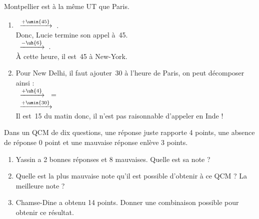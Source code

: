 \begin{colonne*exercice}
\begin{corrige}
   Montpellier est à la même UT que Paris. \\
   \begin{enumerate}
      \item {}\, \quad $\xrightarrow{+\umin{45}}$ \quad {}\,. \\
         Donc, Lucie termine son appel à \,45. \\ [1mm]
         \, \quad $\xrightarrow{-\uh{6}}$ \quad {}\,. \\
         À cette heure, il est {\blue {}\,45} à New-York.
      \item Pour New Delhi, il faut ajouter \,30 à l'heure de Paris, on peut décomposer ainsi : \\ [1mm]
         \, \quad $\xrightarrow{+\uh{4}}$ \quad {}\, = \,\\ [1mm]
         \, \quad $\xrightarrow{+\umin{30}}$ \quad {}\, \\ [1mm]
         Il est \,15 du matin donc, {\blue il n'est pas raisonnable d'appeler en Inde !}
   \end{enumerate}
\end{corrige}

\bigskip


\begin{exercice} %
   Dans un QCM de dix questions, une réponse juste rapporte 4 points, une absence de réponse 0 point et une mauvaise réponse enlève 3 points.
   \begin{enumerate}
      \item Yassin a 2 bonnes réponses et 8 mauvaises. Quelle est sa note ?
      \item Quelle est la plus mauvaise note qu'il est possible d'obtenir à ce QCM ? La meilleure note ?
      \item Chamse-Dine a obtenu 14 points. Donner une combinaison possible pour obtenir ce résultat.
   \end{enumerate}
\end{exercice}


\end{colonne*exercice}
